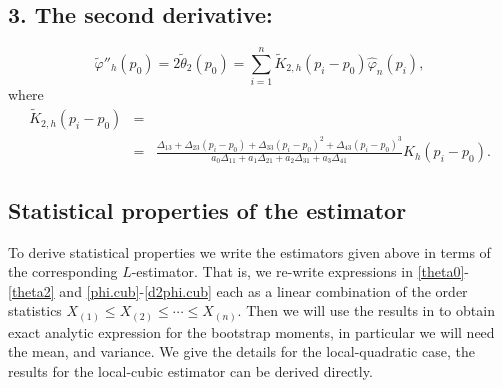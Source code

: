 \documentclass[preprint,12pt]{elsarticle}
\begin{document}
\subsection*{3. The second derivative:}%
\begin{equation}\label{d2phi.cub}
\widetilde{\varphi}''_h(p_0)= 2 \widetilde{\theta}_2(p_0)= \sum_{i=1}^n \widetilde{K}_{2,h}\left(p_i-p_0\right) \widehat{\varphi}_n\left(p_i\right),
\end{equation}
where 
\begin{eqnarray*}
\widetilde{K}_{2,h}\left(p_i-p_0\right)&=&\\
&=& \frac{\Delta_{13}+\Delta_{23}\left(p_i-p_0 \right)+\Delta_{33}\left(p_i-p_0 \right)^2+\Delta_{43}\left(p_i-p_0 \right)^3}{a_0 \Delta_{11}+ a_1 \Delta_{21}+a_2 \Delta_{31}+a_3 \Delta_{41}} K_h\left(p_i-p_0\right).
\end{eqnarray*}





\bigskip

\subsection{Statistical properties of the estimator}\label{stat_prop}
\noindent To derive statistical properties we write the estimators given above in terms of the corresponding $L$-estimator. That is, we re-write expressions in \eqref{theta0}-\eqref{theta2} and \eqref{phi.cub}-\eqref{d2phi.cub} each as a linear combination of the order statistics $X_{(1)} \leq X_{(2)} \leq \cdots \leq X_{(n)}$. Then we will use the results in \cite{HE2000} to obtain exact analytic expression for the bootstrap moments, in particular we will need the mean, and variance. 
We give the details for the local-quadratic case, the results for the local-cubic estimator can be derived directly.
\end{document}
